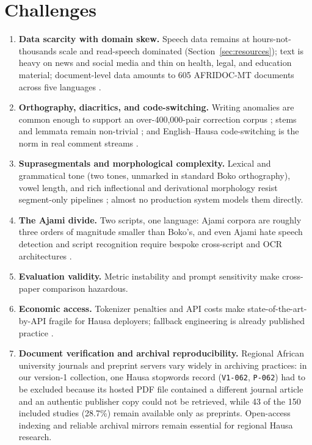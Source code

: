 \documentclass[sn-basic,pdflatex]{sn-jnl}
\begin{document}
\section{Challenges}\label{sec:challenges}
\begin{enumerate}\itemsep2pt
  \item \textbf{Data scarcity with domain skew.} Speech data remains at hours-not-thousands scale and read-speech dominated (Section~\ref{sec:resources}); text is heavy on news and social media and thin on health, legal, and education material; document-level data amounts to 605 AFRIDOC-MT documents across five languages \citep{p030}.
  \item \textbf{Orthography, diacritics, and code-switching.} Writing anomalies are common enough to support an over-400{,}000-pair correction corpus \citep{p067,p146}; stems and lemmata remain non-trivial \citep{p119,p143,p066,p120}; and English--Hausa code-switching is the norm in real comment streams \citep{p073,p135,p142}.
  \item \textbf{Suprasegmentals and morphological complexity.} Lexical and grammatical tone (two tones, unmarked in standard Boko orthography), vowel length, and rich inflectional and derivational morphology resist segment-only pipelines \citep{p006,p066,p077}; almost no production system models them directly.
  \item \textbf{The Ajami divide.} Two scripts, one language: Ajami corpora are roughly three orders of magnitude smaller than Boko's, and even Ajami hate speech detection and script recognition require bespoke cross-script and OCR architectures \citep{p002,p023,p145}.
  \item \textbf{Evaluation validity.} Metric instability \citep{p028,p033,p092,p029,p031} and prompt sensitivity \citep{p017,p018} make cross-paper comparison hazardous.
  \item \textbf{Economic access.} Tokenizer penalties \citep{p019,p152} and API costs make state-of-the-art-by-API fragile for Hausa deployers; fallback engineering is already published practice \citep{p020}.
  \item \textbf{Document verification and archival reproducibility.} Regional African university journals and preprint servers vary widely in archiving practices: in our version-1 collection, one Hausa stopwords record (\texttt{V1-062}, \texttt{P-062}) had to be excluded because its hosted PDF file contained a different journal article and an authentic publisher copy could not be retrieved, while 43 of the 150 included studies (28.7\%) remain available only as preprints. Open-access indexing and reliable archival mirrors remain essential for regional Hausa research.
\end{enumerate}
\end{document}
